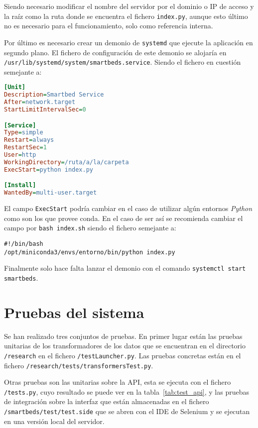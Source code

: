 Siendo necesario modificar el nombre del servidor por el dominio o IP de acceso y la raíz como la ruta donde se encuentra el fichero \texttt{index.py}, aunque esto último no es necesario para el funcionamiento, solo como referencia interna.

Por último es necesario crear un demonio de \texttt{systemd} que ejecute la aplicación en segundo plano. El fichero de configuración de este demonio se alojaría en \texttt{/usr/lib/systemd/system/smartbeds.service}. Siendo el fichero en cuestión semejante a:
\begin{lstlisting}[language={Ini}]
[Unit]
Description=Smartbed Service
After=network.target
StartLimitIntervalSec=0

[Service]
Type=simple
Restart=always
RestartSec=1
User=http
WorkingDirectory=/ruta/a/la/carpeta
ExecStart=python index.py

[Install]
WantedBy=multi-user.target
\end{lstlisting}

El campo \texttt{ExecStart} podría cambiar en el caso de utilizar algún entornos \textit{Python} como son los que provee conda. En el caso de ser así se recomienda cambiar el campo por \texttt{bash index.sh} siendo el fichero semejante a:

\begin{lstlisting}[language=bashb]
#!/bin/bash
/opt/miniconda3/envs/entorno/bin/python index.py
\end{lstlisting}

Finalmente solo hace falta lanzar el demonio con el comando \texttt{systemctl start smartbeds}.

\section{Pruebas del sistema}

Se han realizado tres conjuntos de pruebas. En primer lugar están las pruebas unitarias de los transformadores de los datos que se encuentran en el directorio \texttt{/research} en el fichero \texttt{/testLauncher.py}. Las pruebas concretas están en el fichero \texttt{/research/tests/transformersTest.py}.

Otras pruebas son las unitarias sobre la API, esta se ejecuta con el fichero \texttt{/tests.py}, cuyo resultado se puede ver en la tabla~\ref{tab:test_api}, y las pruebas de integración sobre la interfaz que están almacenadas en el fichero \texttt{/smartbeds/test/test.side} que se abren con el IDE de Selenium y se ejecutan en una versión local del servidor.

